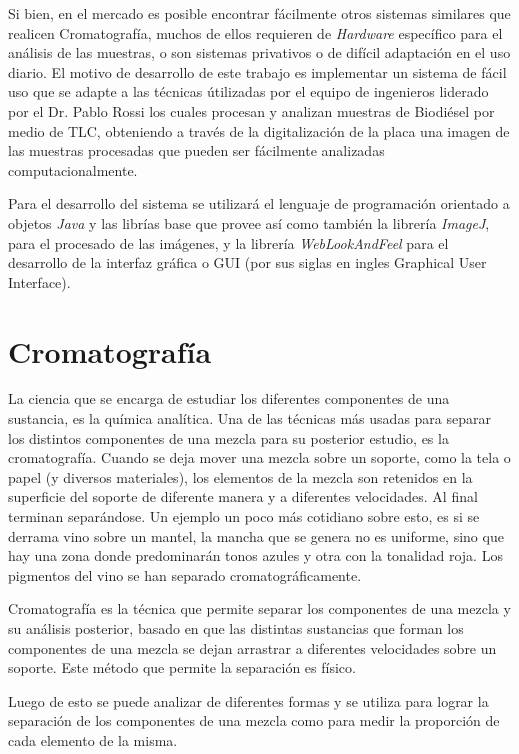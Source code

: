 Si bien, en el mercado es posible encontrar f\'acilmente otros sistemas similares que realicen Cromatograf\'ia, muchos de ellos requieren de \textit{Hardware} espec\'ifico para el an\'alisis de las muestras, o son sistemas privativos o de dif\'icil adaptaci\'on en el uso diario. El motivo de desarrollo de este trabajo es implementar un sistema de f\'acil uso que se adapte a las t\'ecnicas \'utilizadas por el equipo de ingenieros liderado por el Dr. Pablo Rossi los cuales procesan y analizan muestras de Biodi\'esel por medio de TLC, obteniendo a trav\'es de la digitalizaci\'on de la placa una imagen de las muestras procesadas que pueden ser f\'acilmente analizadas computacionalmente. 

Para el desarrollo del sistema se utilizar\'a el lenguaje de programaci\'on orientado a objetos \textit{Java} \cite{java} y las libr\'ias base que provee as\'i como tambi\'en la librer\'ia \textit{ImageJ}, para el procesado de las im\'agenes, y la librer\'ia \textit{WebLookAndFeel} \cite{wlaf} para el desarrollo de la interfaz gr\'afica o GUI (por sus siglas en ingles Graphical User Interface).

\section{Cromatograf\'ia}
La ciencia que se encarga de estudiar los diferentes componentes de una sustancia, es la qu\'imica anal\'itica. Una de las t\'ecnicas m\'as usadas para separar los distintos componentes de una mezcla para su posterior estudio, es la cromatograf\'ia. Cuando se deja mover una mezcla sobre un soporte, como la tela o papel (y diversos materiales), los elementos de la mezcla son retenidos en la superficie del soporte de diferente manera y a diferentes velocidades. Al final terminan separ\'andose. Un ejemplo un poco m\'as cotidiano sobre esto, es si se derrama vino sobre un mantel, la mancha que se genera no es uniforme, sino que hay una zona donde predominar\'an tonos azules y otra con la tonalidad roja. Los pigmentos del vino se han separado cromatogr\'aficamente. 

Cromatograf\'ia es la t\'ecnica que permite separar los componentes de una mezcla y su an\'alisis posterior, basado en que las distintas sustancias que forman los componentes de una mezcla se dejan arrastrar a diferentes velocidades sobre un soporte. Este m\'etodo que permite la separaci\'on es f\'isico.

Luego de esto se puede analizar de diferentes formas y se utiliza para lograr la separaci\'on de los componentes de una mezcla como para medir la proporci\'on de cada elemento de la misma.